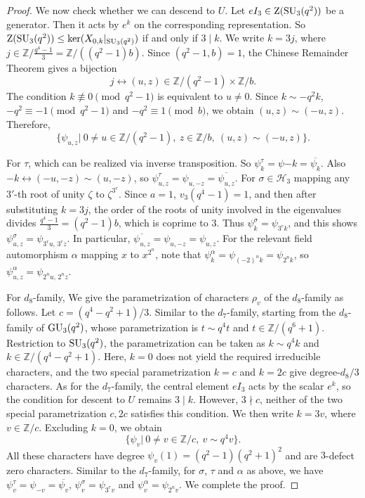 \documentclass[11pt,a4paper]{article}
\numberwithin{equation}{section}
\theoremstyle{definition}
\theoremstyle{remark}
\newcommand{\ZZ}{\mathrm{Z}}
\newcommand{\HH}{\mathcal H}
\begin{document}
\begin{proof}
We now check whether we can descend to \(U\). 
Let $eI_3\in \ZZ({\rm SU}_3(q^2))$ be a  generator. Then it acts by \(e^k\) on the corresponding representation. So
$\ZZ({\rm SU}_3(q^2))\leq\ker(X_{0,k}|_{{\rm SU}_3(q^2)})$
if and only if $3\mid k$. We write $k=3j$, where 
$j\in{\mathbb Z}/\frac{q^4-1}{3}=\mathbb Z/((q^2-1)b)$.
Since $(q^2-1,b)=1$, the Chinese Remainder Theorem gives a bijection
\[ 
j\longleftrightarrow (u,z)\in {\mathbb Z}/(q^2-1)\times{\mathbb Z}/b.
\]
The condition \(k\not\equiv0\pmod{q^2-1}\) is equivalent to \(u\neq0\). Since $k\sim -q^2k$, $-q^2\equiv-1\pmod{q^2-1}$ and $-q^2\equiv1\pmod b$, we obtain $(u,z)\sim(-u,z)$. Therefore,
\begin{equation}
\{\psi_{u,z}|\ 0\ne u\in\mathbb Z/(q^2-1),\ z\in\mathbb Z/b,\ (u,z)\sim(-u,z)\}.    
\end{equation}

For $\tau$, which
can be realized via inverse transposition. So
$\psi_k^\tau=\psi{-k}=\overline{\psi_k}$.
Also  $-k\longleftrightarrow(-u,-z)\sim(u,-z)$, so
$\psi_{u,z}^{\tau}=\psi_{u,-z}=\overline{\psi_{u,z}}$.
For $\sigma\in \HH_3$ mapping any $3'$-th root of unity $\zeta$ to $\zeta^{3^r}$. Since \(a=1\), $v_3(q^4-1)=1$,
and then after substituting \(k=3j\), the order of the roots of unity involved in the eigenvalues divides
$\frac{q^4-1}{3}=(q^2-1)b$, which is coprime to \(3\).
Thus $\psi_k^\sigma=\psi_{3^rk}$, and this shows 
$\psi_{u,z}^{\sigma}=\psi_{3^ru,\,3^rz}$. 
In particular, $\overline{\psi_{u,z}}=\psi_{u,-z}=\psi_{u,z}$.
For  the relevant field automorphism $\alpha$ mapping $x$ to $x^{2^n}$, note that $\psi_k^\alpha=\psi_{(-2)^nk}=\psi_{2^nk}$, so $\psi_{u,z}^{\alpha}=\psi_{2^nu,\,2^nz}$.

For $d_8$-family, We give the parametrization of characters $\rho_v$ of the $d_8$-family as follows. Let $c=(q^4-q^2+1)/3$. Similar to the $d_7$-family, starting from the \(d_8\)-family of ${\rm GU}_3(q^2)$, whose parametrization is $t\sim q^4t$ and  $t\in{\mathbb Z}/(q^6+1)$.
Restriction to \({\rm SU}_3(q^2)\), the parametrization can be taken as $k\sim q^4k$ and $k\in{\mathbb Z}/(q^4-q^2+1)$.
Here, \(k=0\) does not yield the required irreducible characters, and the two special parametrization $k=c$ and $k=2c$ give  degree-\(d_8/3\) characters. As for the $d_7$-family, the central element \(eI_3\) acts by the scalar \(e^k\), so the condition for descent to \(U\) remains
$3\mid k$. However, \(3\nmid c\), neither of the two special 
parametrization \(c,2c\) satisfies this condition. 
We then write $k=3v$, where $v\in\mathbb Z/c$.
Excluding \(k=0\), we obtain 
\begin{equation}
 \{\psi_v|\ 0\ne v\in\mathbb Z/c,\ v\sim q^4v\}.   
\end{equation}
All these characters have degree
$\psi_v(1)=(q^2-1)(q^2+1)^2$ and are $3$-defect zero characters.
Similar to the $d_7$-family, for $\sigma$, $\tau$ and $\alpha$ as above, we have 
$\psi_{v}^{\tau}=\psi_{-v}=\overline{\psi_{v}}$,
$\psi_{v}^{\sigma}=\psi_{3^rv}$ and $\psi_{v}^{\alpha}=\psi_{2^nv}$.  
We complete the proof.
\end{proof}
\end{document}
